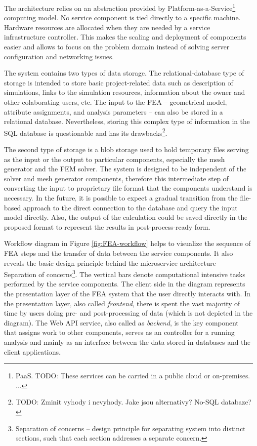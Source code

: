 The architecture relies on an abstraction provided by Platform-as-a-Service\footnote{PaaS. TODO: These services can be carried in a public cloud or on-premises. ...} computing model. No service component is tied directly to a specific machine. Hardware resources are allocated when they are needed by a service infrastructure controller. This makes the scaling and deployment of components easier and allows to focus on the problem domain instead of solving server configuration and networking issues.

The system contains two types of data storage. The relational-database type of storage is intended to store basic project-related data such as description of simulations, links to the simulation resources, information about the owner and other colaborating users, etc. The input to the FEA -- geometrical model, attribute assignments, and analysis parameters -- can also be stored in a relational database. Nevertheless, storing this complex type of information in the SQL database is questionable and has its drawbacks\footnote{TODO: Zminit vyhody i nevyhody. Jake jsou alternativy? No-SQL databaze?}.

The second type of storage is a blob storage used to hold temporary files serving as the input or the output to particular components, especially the mesh generator and the FEM solver. The system is designed to be independent of the solver and mesh generator components, therefore this intermediate step of converting the input to proprietary file format that the components understand is necessary. In the future, it is possible to expect a gradual transition from the file-based approach to the direct connection to the database and query the input model directly. Also, the output of the calculation could be saved directly in the proposed format to represent the results in post-process-ready form.

Workflow diagram in Figure \ref{fig:FEA-workflow} helps to visualize the sequence of FEA steps and the transfer of data between the service components. It also reveals the basic design principle behind the microservice architecture -- Separation of concerns\footnote{Separation of concerns -- design principle for separating system into distinct sections, such that each section addresses a separate concern.}. The vertical bars denote computational intensive tasks performed by the service components. The client side in the diagram represents the presentation layer of the FEA system that the user directly interacts with. In the presentation layer, also called \textit{frontend}, there is spent the vast majority of time by users doing pre- and post-processing of data (which is not depicted in the diagram). The Web API service, also called as \textit{backend}, is the key component that assigns work to other components, serves as an controller for a running analysis and mainly as an interface between the data stored in databases and the client applications.

